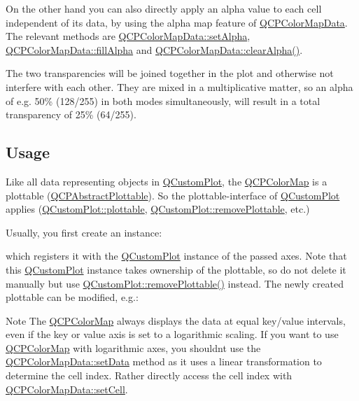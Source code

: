 On the other hand you can also directly apply an alpha value to each cell independent of its data, by using the alpha map feature of \hyperlink{class_q_c_p_color_map_data}{Q\+C\+P\+Color\+Map\+Data}. The relevant methods are \hyperlink{class_q_c_p_color_map_data_aaf7de5b34c58f38d8f4c1ceb064a876c}{Q\+C\+P\+Color\+Map\+Data\+::set\+Alpha}, \hyperlink{class_q_c_p_color_map_data_a93e2a549d7702bc849cd48a585294657}{Q\+C\+P\+Color\+Map\+Data\+::fill\+Alpha} and \hyperlink{class_q_c_p_color_map_data_a14d08b9c3720cd719400079b86d3906b}{Q\+C\+P\+Color\+Map\+Data\+::clear\+Alpha()}.

The two transparencies will be joined together in the plot and otherwise not interfere with each other. They are mixed in a multiplicative matter, so an alpha of e.\+g. 50\% (128/255) in both modes simultaneously, will result in a total transparency of 25\% (64/255).\hypertarget{class_q_c_p_color_map_qcpcolormap-usage}{}\subsection{Usage}\label{class_q_c_p_color_map_qcpcolormap-usage}
Like all data representing objects in \hyperlink{class_q_custom_plot}{Q\+Custom\+Plot}, the \hyperlink{class_q_c_p_color_map}{Q\+C\+P\+Color\+Map} is a plottable (\hyperlink{class_q_c_p_abstract_plottable}{Q\+C\+P\+Abstract\+Plottable}). So the plottable-\/interface of \hyperlink{class_q_custom_plot}{Q\+Custom\+Plot} applies (\hyperlink{class_q_custom_plot_a32de81ff53e263e785b83b52ecd99d6f}{Q\+Custom\+Plot\+::plottable}, \hyperlink{class_q_custom_plot_af3dafd56884208474f311d6226513ab2}{Q\+Custom\+Plot\+::remove\+Plottable}, etc.)

Usually, you first create an instance\+: 
\begin{DoxyCodeInclude}
\end{DoxyCodeInclude}
which registers it with the \hyperlink{class_q_custom_plot}{Q\+Custom\+Plot} instance of the passed axes. Note that this \hyperlink{class_q_custom_plot}{Q\+Custom\+Plot} instance takes ownership of the plottable, so do not delete it manually but use \hyperlink{class_q_custom_plot_af3dafd56884208474f311d6226513ab2}{Q\+Custom\+Plot\+::remove\+Plottable()} instead. The newly created plottable can be modified, e.\+g.\+: 
\begin{DoxyCodeInclude}
\end{DoxyCodeInclude}
 \begin{DoxyNote}{Note}
The \hyperlink{class_q_c_p_color_map}{Q\+C\+P\+Color\+Map} always displays the data at equal key/value intervals, even if the key or value axis is set to a logarithmic scaling. If you want to use \hyperlink{class_q_c_p_color_map}{Q\+C\+P\+Color\+Map} with logarithmic axes, you shouldn\textquotesingle{}t use the \hyperlink{class_q_c_p_color_map_data_afd2083ccfd6987ec94aa7ef8e91ca39a}{Q\+C\+P\+Color\+Map\+Data\+::set\+Data} method as it uses a linear transformation to determine the cell index. Rather directly access the cell index with \hyperlink{class_q_c_p_color_map_data_a8e75eaf8746596319032a93f3d2d0683}{Q\+C\+P\+Color\+Map\+Data\+::set\+Cell}. 
\end{DoxyNote}


